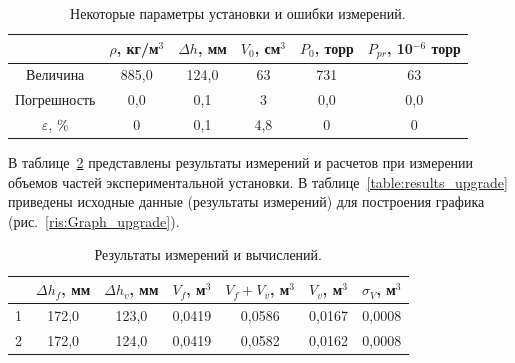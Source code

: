 \documentclass[a4paper,12pt]{article} %
\begin{document}
\begin{table}[H]
\caption{Некоторые параметры установки и ошибки измерений.}
\label{table:parametri}
\begin{tabular}{|c|c|c|c|c|c|}
\hline
                  & $\rho$, кг/м$^3$ & $\Delta h$, мм & $V_0$, см$^3$ & $P_0$, торр & $P_{pr}$, 10$^{-6}$ торр \\ \hline
Величина          & 885,0            & 124,0          & 63            & 731         & 63                       \\ \hline
Погрешность       & 0,0              & 0,1            & 3             & 0,0         & 0,0                      \\ \hline
$\varepsilon$, \% & 0                & 0,1            & 4,8           & 0           & 0                        \\ \hline
\end{tabular}
\end{table}

	В таблице~\ref{table:result_of_ob`em} представлены результаты измерений и расчетов при измерении объемов частей экспериментальной установки. В таблице~\ref{table:results_upgrade} приведены исходные данные (результаты измерений) для построения графика (рис.~\ref{ris:Graph_upgrade}).
	
	
\begin{table}[H]
\caption{Результаты измерений и вычислений.}
\label{table:result_of_ob`em}
\begin{tabular}{|c|c|c|c|c|c|c|}
\hline
  & $\Delta h_f$, мм & $\Delta h_v$, мм & $V_f$, м$^3$ & $V_f + V_v$, м$^3$ & $V_v$, м$^3$ & $\sigma_V$, м$^3$ \\ \hline
1 & 172,0            & 123,0            & 0,0419       & 0,0586             & 0,0167       & 0,0008                \\ \hline
2 & 172,0            & 124,0            & 0,0419       & 0,0582             & 0,0162       & 0,0008                \\ \hline
\end{tabular}
\end{table}
	
\end{document}
